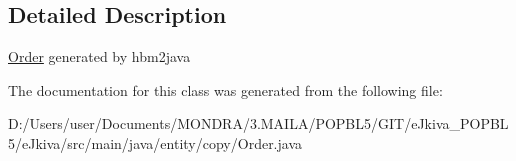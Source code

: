 \subsection{Detailed Description}
\mbox{\hyperlink{classentity_1_1copy_1_1_order}{Order}} generated by hbm2java 

The documentation for this class was generated from the following file\+:\begin{DoxyCompactItemize}
\item 
D\+:/\+Users/user/\+Documents/\+M\+O\+N\+D\+R\+A/3.\+M\+A\+I\+L\+A/\+P\+O\+P\+B\+L5/\+G\+I\+T/e\+Jkiva\+\_\+\+P\+O\+P\+B\+L5/e\+Jkiva/src/main/java/entity/copy/Order.\+java\end{DoxyCompactItemize}
